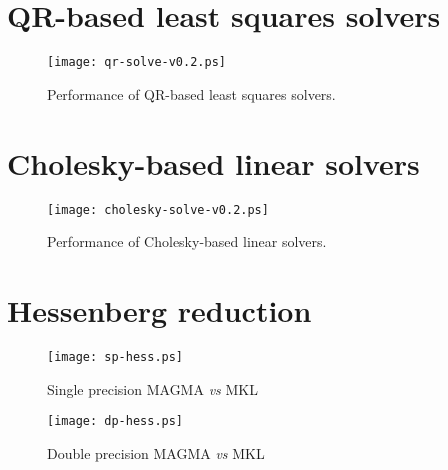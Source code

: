 \documentclass[10pt]{book}
\begin{document}
\newpage
\section{QR-based least squares solvers}
       \begin{figure}[!ht]
          \centering
          \hspace{-5mm}
          \texttt{[image: qr-solve-v0.2.ps]}
          \caption{Performance of QR-based least squares solvers.}
       \label{qr-solvers}
       \end{figure}

\newpage
\section{Cholesky-based linear solvers}
       \begin{figure}[!ht]
          \centering
          \hspace{-5mm}
          \texttt{[image: cholesky-solve-v0.2.ps]}
          \caption{Performance of Cholesky-based linear solvers.}
       \label{cholesky-solvers}
       \end{figure}

\newpage
\section{Hessenberg reduction}
       \begin{figure}[!ht]
          \centering
          \hspace{-5mm}
          \texttt{[image: sp-hess.ps]}
          \caption{Single precision MAGMA {\it vs} MKL}
       \label{cholesky-solvers}
       \end{figure}

       \begin{figure}[!ht]
          \centering
          \hspace{-5mm}
          \texttt{[image: dp-hess.ps]}
          \caption{Double precision MAGMA {\it vs} MKL}
       \label{cholesky-solvers}
       \end{figure}
\end{document}
